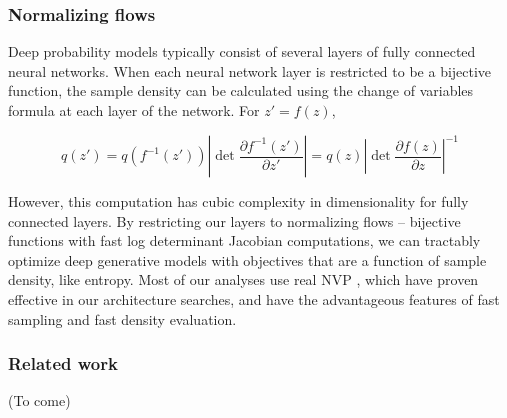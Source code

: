 \documentclass[11pt]{article}
\begin{document}
\subsubsection{Normalizing flows}\label{methods_NF}
Deep probability models typically consist of several layers of fully connected neural networks.  When each neural network layer is restricted to be a bijective function, the sample density can be calculated using the change of variables formula at each layer of the network.  For $z' = f(z)$,

\begin{equation}
q(z') = q(f^{-1}(z')) \left| \det \frac{\partial f^{-1}(z')}{\partial z'} \right| = q(z) \left| \det \frac{\partial f(z)}{\partial z} \right|^{-1}
\end{equation}

However, this computation has cubic complexity in dimensionality for fully connected layers.  By restricting our layers to normalizing flows \cite{rezende2015variational} -- bijective functions with fast log determinant Jacobian computations, we can tractably optimize deep generative models with objectives that are a function of sample density, like entropy. Most of our analyses use real NVP \cite{dinh2017density}, which have proven effective in our architecture searches, and have the advantageous features of fast sampling and fast density evaluation.

\subsubsection{Related work}\label{methods_related_work}
(To come)\\
\end{document}
